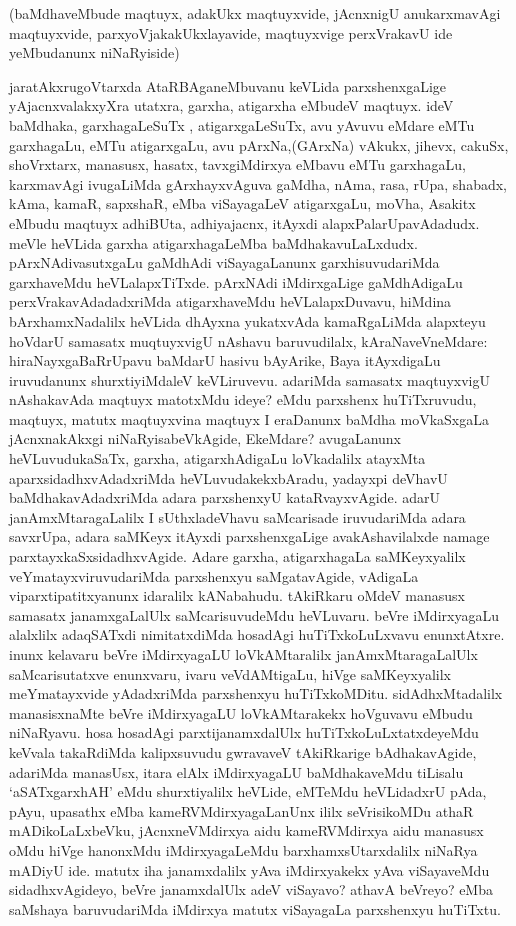 

\begin{artha}
(baMdhaveMbude maqtuyx, adakUkx maqtuyxvide, jAcnxnigU anukarxmavAgi maqtuyxvide, 
parxyoVjakakUkxlayavide, maqtuyxvige perxVrakavU ide yeMbudanunx niNaRyiside)

jaratAkxrugoVtarxda AtaRBAganeMbuvanu keVLida parxshenxgaLige yAjacnxvalakxyXra utatxra, 
garxha, atigarxha eMbudeV maqtuyx. ideV baMdhaka, garxhagaLeSuTx , atigarxgaLeSuTx, avu 
yAvuvu eMdare eMTu garxhagaLu, eMTu atigarxgaLu, avu pArxNa,(GArxNa) vAkukx, jihevx, 
cakuSx, shoVrxtarx, manasusx, hasatx, tavxgiMdirxya eMbavu eMTu garxhagaLu, karxmavAgi 
ivugaLiMda gArxhayxvAguva gaMdha, nAma, rasa, rUpa, shabadx, kAma, kamaR, sapxshaR, eMba 
viSayagaLeV atigarxgaLu, moVha, Asakitx eMbudu maqtuyx adhiBUta, adhiyajacnx, itAyxdi 
alapxPalarUpavAdadudx. meVle heVLida garxha atigarxhagaLeMba baMdhakavuLaLxdudx. 
pArxNAdivasutxgaLu gaMdhAdi viSayagaLanunx garxhisuvudariMda garxhaveMdu heVLalapxTiTxde.
pArxNAdi iMdirxgaLige gaMdhAdigaLu  perxVrakavAdadadxriMda atigarxhaveMdu 
heVLalapxDuvavu, hiMdina bArxhamxNadalilx heVLida dhAyxna yukatxvAda kamaRgaLiMda alapxteyu hoVdarU samasatx muqtuyxvigU nAshavu baruvudilalx, kAraNaveVneMdare: hiraNayxgaBaRrUpavu baMdarU hasivu bAyArike, Baya itAyxdigaLu iruvudanunx shurxtiyiMdaleV keVLiruvevu. adariMda samasatx maqtuyxvigU nAshakavAda maqtuyx matotxMdu ideye? eMdu parxshenx  huTiTxruvudu, maqtuyx, matutx maqtuyxvina maqtuyx I eraDanunx baMdha moVkaSxgaLa jAcnxnakAkxgi niNaRyisabeVkAgide, EkeMdare? avugaLanunx heVLuvudukaSaTx, garxha, atigarxhAdigaLu loVkadalilx atayxMta aparxsidadhxvAdadxriMda heVLuvudakekxbAradu, yadayxpi deVhavU baMdhakavAdadxriMda adara parxshenxyU kataRvayxvAgide. adarU janAmxMtaragaLalilx I sUthxladeVhavu saMcarisade iruvudariMda adara savxrUpa, adara saMKeyx itAyxdi parxshenxgaLige avakAshavilalxde namage parxtayxkaSxsidadhxvAgide. Adare garxha, atigarxhagaLa saMKeyxyalilx veYmatayxviruvudariMda parxshenxyu saMgatavAgide, vAdigaLa viparxtipatitxyanunx idaralilx kANabahudu. tAkiRkaru oMdeV manasusx samasatx janamxgaLalUlx saMcarisuvudeMdu heVLuvaru. beVre iMdirxyagaLu alalxlilx adaqSATxdi nimitatxdiMda hosadAgi huTiTxkoLuLxvavu enunxtAtxre. inunx kelavaru beVre iMdirxyagaLU loVkAMtaralilx janAmxMtaragaLalUlx saMcarisutatxve enunxvaru, ivaru veVdAMtigaLu, hiVge saMKeyxyalilx meYmatayxvide yAdadxriMda parxshenxyu huTiTxkoMDitu. sidAdhxMtadalilx manasisxnaMte beVre iMdirxyagaLU loVkAMtarakekx hoVguvavu eMbudu niNaRyavu. hosa hosadAgi parxtijanamxdalUlx huTiTxkoLuLxtatxdeyeMdu keVvala takaRdiMda kalipxsuvudu gwravaveV tAkiRkarige  bAdhakavAgide, adariMda manasUsx, itara elAlx iMdirxyagaLU baMdhakaveMdu tiLisalu `aSATxgarxhAH' eMdu shurxtiyalilx heVLide, eMTeMdu heVLidadxrU pAda, pAyu, upasathx eMba kameRVMdirxyagaLanUnx ililx seVrisikoMDu athaR mADikoLaLxbeVku, jAcnxneVMdirxya aidu kameRVMdirxya aidu manasusx oMdu hiVge hanonxMdu iMdirxyagaLeMdu barxhamxsUtarxdalilx niNaRya mADiyU ide. matutx iha janamxdalilx yAva iMdirxyakekx yAva viSayaveMdu sidadhxvAgideyo, beVre janamxdalUlx adeV viSayavo? athavA beVreyo? eMba saMshaya baruvudariMda iMdirxya matutx viSayagaLa parxshenxyu huTiTxtu.


\end{artha}
